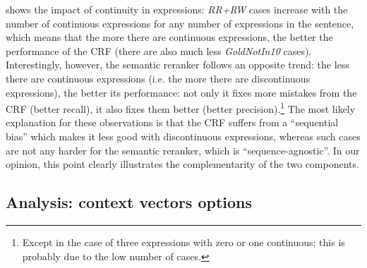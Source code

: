 \documentclass[output=paper,modfonts,nonflat]{langsci/langscibook}
\begin{document}
 shows the impact of continuity in
expressions: {\em RR+RW} cases increase with the number of continuous
expressions for any number of expressions in the sentence, which means that the more
there are continuous expressions, the better the performance of the
CRF (there are also much less {\em GoldNotIn10} cases). Interestingly,
however, the semantic reranker follows an opposite trend: the less
there are continuous expressions (i.e. the more there are
discontinuous expressions), the better its performance: not only it
fixes more mistakes from the CRF (better recall), it also fixes them
better (better precision).\footnote{Except in the case of three
  expressions with zero or one continuous; this is probably due to the
  low number of cases.} The most likely explanation for these
observations is that the CRF suffers from a ``sequential bias'' which
makes it less good with discontinuous expressions, whereas such cases
are not any harder for the semantic reranker, which is
``sequence-agnostic''. In our opinion, this point clearly illustrates
the complementarity of the two components.



\subsection{Analysis: context vectors options}
\label{analysisContextOptions}
\end{document}

